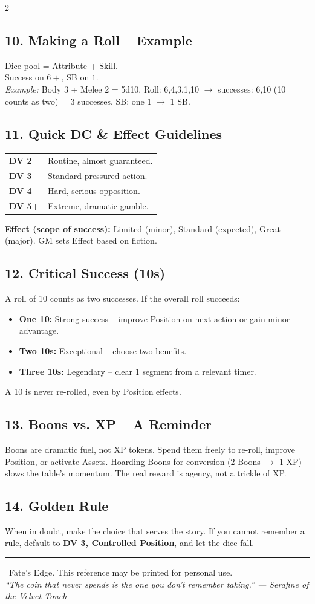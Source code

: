 \documentclass[10pt,landscape]{article}
\begin{document}
\begin{multicols}{2}
\subsection*{10. Making a Roll -- Example}
Dice pool = Attribute + Skill. \\
Success on $6+$, SB on $1$. \\
\emph{Example:} Body 3 + Melee 2 = 5d10. Roll: 6,4,3,1,10 $\rightarrow$ successes: 6,10 (10 counts as two) = 3 successes. SB: one 1 $\rightarrow$ 1 SB.

\subsection*{11. Quick DC \& Effect Guidelines}
\begin{tabularx}{\linewidth}{@{} l X @{}}
\textbf{DV 2} & Routine, almost guaranteed. \\
\textbf{DV 3} & Standard pressured action. \\
\textbf{DV 4} & Hard, serious opposition. \\
\textbf{DV 5+} & Extreme, dramatic gamble. \\
\end{tabularx}
\vspace{0.5ex}
\textbf{Effect (scope of success):} Limited (minor), Standard (expected), Great (major). GM sets Effect based on fiction.

\subsection*{12. Critical Success (10s)}
A roll of 10 counts as two successes. If the overall roll succeeds:
\begin{itemize}
    \item \textbf{One 10:} Strong success -- improve Position on next action or gain minor advantage.
    \item \textbf{Two 10s:} Exceptional -- choose two benefits.
    \item \textbf{Three 10s:} Legendary -- clear 1 segment from a relevant timer.
\end{itemize}
A 10 is never re-rolled, even by Position effects.

\subsection*{13. Boons vs. XP -- A Reminder}
Boons are dramatic fuel, not XP tokens. Spend them freely to re-roll, improve Position, or activate Assets. Hoarding Boons for conversion (2 Boons $\rightarrow$ 1 XP) slows the table's momentum. The real reward is agency, not a trickle of XP.

\subsection*{14. Golden Rule}
When in doubt, make the choice that serves the story. If you cannot remember a rule, default to \textbf{DV 3, Controlled Position}, and let the dice fall.

\end{multicols}
\vspace{1ex}
\hrule
\begin{center}
\small \textcopyright\ Fate's Edge. This reference may be printed for personal use. \\
\emph{``The coin that never spends is the one you don't remember taking.'' --- Serafine of the Velvet Touch}
\end{center}
\end{document}
